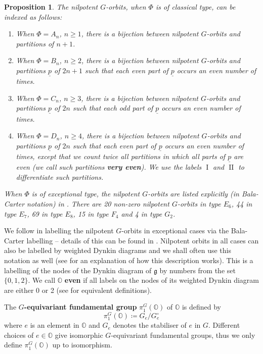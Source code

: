 \documentclass[11pt]{amsart}
\renewcommand{\O}{{\mathbb O}}
\newcommand{\g}{{\mathfrak g}}
\newcommand{\I}{{\mathfrak I}}
\newcommand{\II}{{\operatorname{II}}}
\renewcommand{\I}{{\operatorname{I}}}
\newtheorem{prop}[theorem]{Proposition}
\numberwithin{equation}{section}
\begin{document}
	\begin{prop}\label{p: nilporbs}
		The nilpotent $G$-orbits, when $\Phi$ is of classical type, can be indexed as follows:
		\begin{enumerate}
			\item When $\Phi=A_n$, $n\geq 1$, there is a bijection between nilpotent $G$-orbits and partitions of $n+1$.
			\item When $\Phi=B_n$, $n\geq 2$, there is a bijection between nilpotent $G$-orbits and partitions $\underline{p}$ of $2n+1$ such that each even part of $\underline{p}$ occurs an even number of times.
			\item When $\Phi=C_n$, $n\geq 3$, there is a bijection between nilpotent $G$-orbits and partitions $\underline{p}$ of $2n$ such that each odd part of $\underline{p}$ occurs an even number of times.
			\item When $\Phi=D_n$, $n\geq 4$, there is a bijection between nilpotent $G$-orbits and partitions $\underline{p}$ of $2n$ such that each even part of $\underline{p}$ occurs an even number of times, except that we count twice all partitions in which all parts of $\underline{p}$ are even (we call such partitions {\bf very even}). We use the labels $\I$ and $\II$ to differentiate such partitions.
		\end{enumerate}
		When $\Phi$ is of exceptional type, the nilpotent $G$-orbits are listed explicitly (in Bala-Carter notation) in \cite[\S 8.4]{CM}. There are  20 non-zero nilpotent $G$-orbits in type $E_6$, 44 in type $E_7$, 69 in type $E_8$, 15 in type $F_4$ and 4 in type $G_2$.
	\end{prop}
	
	We follow \cite{CM} in labelling the nilpotent $G$-orbits in exceptional cases via the Bala-Carter labelling -- details of this can be found in \cite[\S8]{CM}. Nilpotent orbits in all cases can also be labelled by weighted Dynkin diagrams and we shall often use this notation as well (see \cite[\S 3.5]{CM} for an explanation of how this description works). This is a labelling of the nodes of the Dynkin diagram of $\g$ by numbers from the set $\{0,1,2\}$. We call $\O$ {\bf even} if all labels on the nodes of its weighted Dynkin diagram are either 0 or 2 (see \cite[\S 3.8]{CM} for equivalent definitions). 
	
	The {\bf $G$-equivariant fundamental group} $\pi_1^G(\O)$ of $\O$ is defined by $$\pi_1^G(\O)\coloneqq G_e/G_e^\circ$$ where $e$ is an element in $\O$ and $G_e$ denotes the stabiliser of $e$ in $G$. Different choices of $e\in\O$ give isomorphic $G$-equivariant fundamental groups, thus we only define $\pi_1^G(\O)$ up to isomorphism.
	
\end{document}
